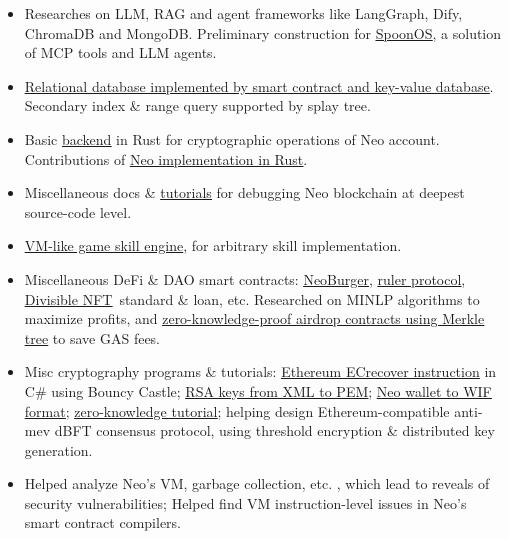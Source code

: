 \begin{experiences}
{\begin{itemize}
                        \item Researches on LLM, RAG and agent frameworks like LangGraph, Dify, ChromaDB and MongoDB. Preliminary construction for \href{https://github.com/xspoonai}{\underline{SpoonOS}}, a solution of MCP tools and LLM agents.
                        \item \href{https://github.com/Hecate2/RelationalDB}{\underline{Relational database implemented by smart contract and key-value database}}. Secondary index \& range query supported by splay tree.
                        \item Basic \href{https://github.com/Hecate2/oauth-account-backend}{\underline{backend}} in Rust for cryptographic operations of Neo account. Contributions of \href{https://github.com/r3e-network/NeoRust}{\underline{Neo implementation in Rust}}.
                        \item Miscellaneous docs \& \href{https://github.com/Hecate2/how-to-debug-neo/}{\underline{tutorials}} for debugging Neo blockchain at deepest source-code level.
                        \item \href{https://github.com/Hecate2/SukaLambda}{\underline{VM-like game skill engine}}, for arbitrary skill implementation. 
                        \item Miscellaneous DeFi \& DAO smart contracts:   \href{https://github.com/neoburger/}{\underline{NeoBurger}}, \href{https://github.com/Hecate2/neo-ruler/}{\underline{ruler protocol}}, \href{https://github.com/Hecate2/NFTLoan}{\underline{Divisible NFT}}\, standard \& loan, etc. Researched on MINLP algorithms to maximize profits, and \href{https://github.com/Hecate2/MerkleTreeForAirDrop}{\underline{zero-knowledge-proof airdrop contracts using Merkle tree}} to save GAS fees. 
                        \item Misc cryptography programs \& tutorials: \href{https://github.com/Hecate2/ECrecover}{\underline{Ethereum ECrecover instruction}} in C\# using Bouncy Castle; \href{https://github.com/Hecate2/RSA-xml-to-pem}{\underline{RSA keys from XML to PEM}}; \href{https://github.com/Hecate2/nep2wif}{\underline{Neo wallet to WIF format}}; \href{https://github.com/Hecate2/zk-principle}{\underline{zero-knowledge tutorial}}; helping design Ethereum-compatible anti-mev dBFT consensus protocol, using threshold encryption \& distributed key generation. 
                        \item Helped analyze Neo's VM, garbage collection, etc. , which lead to reveals of security vulnerabilities; Helped find VM instruction-level issues in Neo's smart contract compilers.

\end{itemize}}
\end{experiences}
